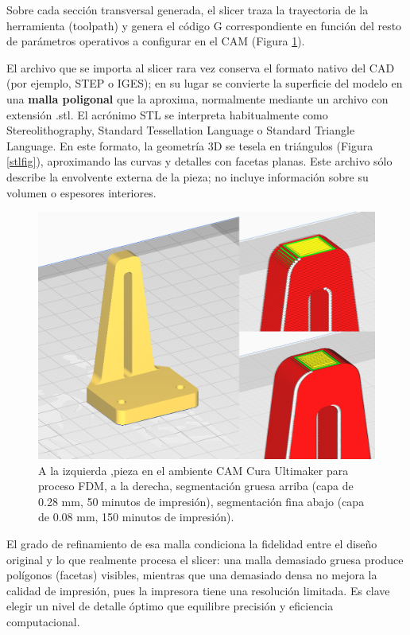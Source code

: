 Sobre cada sección transversal generada, el slicer traza la trayectoria de la herramienta (toolpath) y genera el código G correspondiente en función del resto de parámetros operativos a configurar en el CAM (Figura \ref{slicerfig}).

El archivo que se importa al slicer rara vez conserva el formato nativo del CAD (por ejemplo, STEP o IGES); en su lugar se convierte la superficie del modelo en una \textbf{malla poligonal} que la aproxima, normalmente mediante un archivo con extensión .stl. El acrónimo STL se interpreta habitualmente como Stereolithography, Standard Tessellation Language o Standard Triangle Language. En este formato, la geometría 3D se tesela en triángulos (Figura \ref{stlfig}), aproximando las curvas y detalles con facetas planas. Este archivo sólo describe la envolvente externa de la pieza; no incluye información sobre su volumen o espesores interiores. 

\begin{figure}[h!]
	\centering
	\includegraphics[width=0.8\linewidth]{imgs/slicer.png}
	\caption{A la izquierda ,pieza en el ambiente CAM Cura Ultimaker para proceso FDM, a la derecha, segmentación gruesa arriba (capa de 0.28 mm, 50 minutos de impresión), segmentación fina abajo (capa de 0.08 mm, 150 minutos de impresión).}
	\label{slicerfig}
\end{figure} 

El grado de refinamiento de esa malla condiciona la fidelidad entre el diseño original y lo que realmente procesa el slicer: una malla demasiado gruesa produce polígonos (facetas) visibles, mientras que una demasiado densa no mejora la calidad de impresión, pues la impresora tiene una resolución limitada. Es clave elegir un nivel de detalle óptimo que equilibre precisión y eficiencia computacional.

